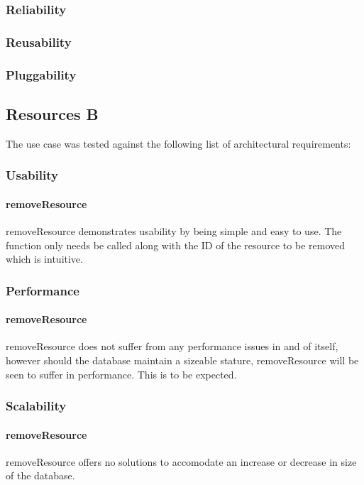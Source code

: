 \documentclass[a4paper]{article}
\begin{document}
\subsubsection {Reliability}
\subsubsection {Reusability}
\subsubsection {Pluggability}


\subsection {Resources B}
The use case was tested against the following list of architectural requirements:
\subsubsection {Usability}

\paragraph{removeResource}
removeResource demonstrates usability by being simple and easy to use. The function only needs be called along with the ID of the resource to be removed which is intuitive.

\subsubsection {Performance}

\paragraph{removeResource}
removeResource does not suffer from any performance issues in and of itself, however should the database maintain a sizeable stature, removeResource will be seen to suffer in performance. This is to be expected.

\subsubsection {Scalability}

\paragraph{removeResource}
removeResource offers no solutions to accomodate an increase or decrease in size of the database.
\end{document}
